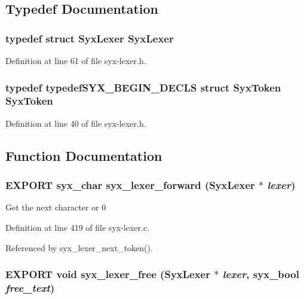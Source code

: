 \subsection{Typedef Documentation}
\hypertarget{syx-lexer_8h_3733ec16e98fecf11d71d3cbe946b2bf}{
\subsubsection{\setlength{\rightskip}{0pt plus 5cm}typedef struct {\bf SyxLexer} {\bf SyxLexer}}}
\label{syx-lexer_8h_3733ec16e98fecf11d71d3cbe946b2bf}




Definition at line 61 of file syx-lexer.h.\hypertarget{syx-lexer_8h_7502114c271d052a9577c868bbb724a1}{
\subsubsection{\setlength{\rightskip}{0pt plus 5cm}typedef typedefSYX\_\-BEGIN\_\-DECLS struct {\bf SyxToken} {\bf SyxToken}}}
\label{syx-lexer_8h_7502114c271d052a9577c868bbb724a1}




Definition at line 40 of file syx-lexer.h.

\subsection{Function Documentation}
\hypertarget{syx-lexer_8h_4bbe34b294fb616df37253f173686153}{
\subsubsection{\setlength{\rightskip}{0pt plus 5cm}EXPORT {\bf syx\_\-char} syx\_\-lexer\_\-forward ({\bf SyxLexer} $\ast$ {\em lexer})}}
\label{syx-lexer_8h_4bbe34b294fb616df37253f173686153}


Get the next character or 0 

Definition at line 419 of file syx-lexer.c.

Referenced by syx\_\-lexer\_\-next\_\-token().\hypertarget{syx-lexer_8h_a895ca7c0e097297c327c10ab7d78453}{
\subsubsection{\setlength{\rightskip}{0pt plus 5cm}EXPORT void syx\_\-lexer\_\-free ({\bf SyxLexer} $\ast$ {\em lexer}, \/  {\bf syx\_\-bool} {\em free\_\-text})}}
\label{syx-lexer_8h_a895ca7c0e097297c327c10ab7d78453}


